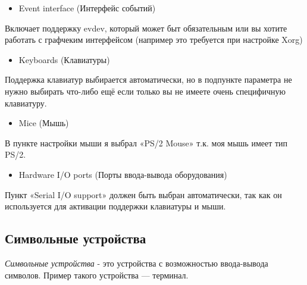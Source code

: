 \documentclass[10pt]{book}
\begin{document}
\begin{itemize}
\item Event interface (Интерфейс событий)
\end{itemize}

Включает поддержку evdev, который может быт обязательным или вы хотите работать с графчеким интерфейсом (например это требуется при настройке Xorg)

\begin{itemize}
\item Keyboards (Клавиатуры)
\end{itemize}

Поддержка клавиатур выбирается автоматически, но в подпункте параметра не нужно выбирать что-либо ещё если только вы не имеете очень специфичную клавиатуру.

\begin{itemize}
\item Mice (Мышь)
\end{itemize}

В пункте настройки мыши я выбрал «PS/2 Mouse» т.к. моя мышь имеет тип PS/2. 

\begin{itemize}
\item Hardware I/O ports (Порты ввода-вывода оборудования)
\end{itemize}

Пункт «Serial I/O support» должен быть выбран автоматически, так как он используется для активации поддержки клавиатуры и мыши.

\subsection{Символьные устройства}

\textit{Символьные устройства} - это устройства с возможностью ввода-вывода символов. Пример такого устройства — терминал.
\end{document}
